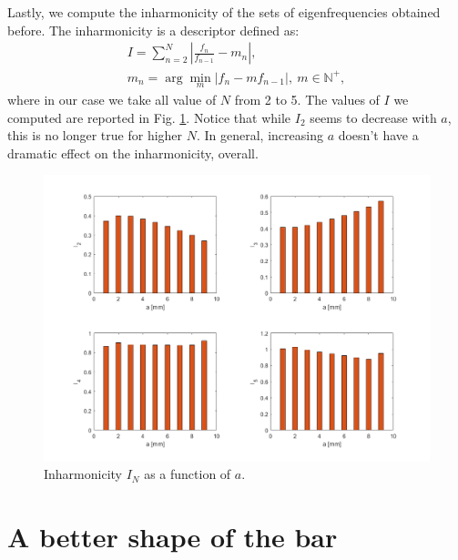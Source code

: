 \documentclass[a4paper]{article}
\begin{document}
Lastly, we compute the inharmonicity of the sets of eigenfrequencies obtained before. The inharmonicity is a descriptor defined as:
\begin{gather*}
	I = \sum_{n=2}^{N} \left| \frac{f_n}{f_{n-1}} - m_n \right|, \\
	m_n = \arg \underset{m}{\min} \left| f_n - m f_{n-1} \right|,~ m \in \mathbb{N}^+,
\end{gather*}
where in our case we take all value of $N$ from 2 to 5. The values of $I$ we computed are reported in Fig. \ref{fig:inharm}. Notice that while $I_2$ seems to decrease with $a$, this is no longer true for higher $N$. In general, increasing $a$ doesn't have a dramatic effect on the inharmonicity, overall.

\begin{figure}[h]
	\centering
	\includegraphics[width=0.85\linewidth]{inharmonicity.png}
	\caption{Inharmonicity $I_N$ as a function of $a$.}
	\label{fig:inharm}
\end{figure}

\section{A better shape of the bar}
\end{document}

